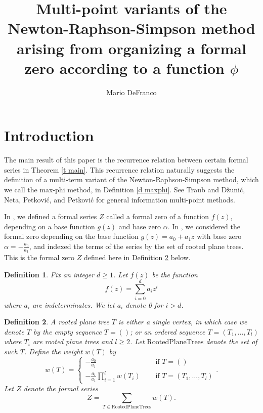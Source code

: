 \documentclass[11pt, oneside]{article}   	%
\newtheorem{definition}{Definition}
\begin{document}
\title{Multi-point variants of the Newton-Raphson-Simpson method arising from organizing a formal zero according to a function $\phi$ }
\author{Mario DeFranco}
\maketitle



\section{Introduction}

The main result of this paper is the recurrence relation between certain formal series in Theorem \ref{t main}. This recurrence relation naturally suggests the definition of a multi-term variant of the Newton-Raphson-Simpson method,  which we call the max-phi method, in Definition \ref{d maxphi}. See Traub \cite{Traub} and D\u{z}uni\'{c}, Neta, Petkovi\'{c}, and Petkovi\'{c} \cite{Dzunic} for general information multi-point methods. 

In \cite{DeFranco gb}, we defined a formal series $Z$ called a formal zero of a function $f(z)$, depending on a base function $g(z)$ and base zero $\alpha$. In \cite{DeFranco ce}, we considered the formal zero depending on the base function $g(z) = a_0 + a_1z$ with base zero $\alpha=-\frac{a_0}{a_1}$, and indexed the terms of the series by the set of rooted plane trees. This is the formal zero $Z$ defined here in Definition \ref{d RPT} below.

\begin{definition} 
Fix an integer $d \geq 1$. Let $f(z)$ be the function 
\[
f(z) = \sum_{i=0}^d a_i z^i
\]
where $a_i$ are indeterminates. We let $a_i$ denote 0 for $i >d$.
\end{definition}

\begin{definition} \label{d RPT}
A rooted plane tree $T$ is either a single vertex, in which case we denote $T$ by the empty sequence $T=()$; or an ordered sequence $T=(T_1, \ldots, T_l)$ where $T_i$ are rooted plane trees and $l \geq 2$. Let $\mathrm{RootedPlaneTrees}$ denote the set of such $T$. 
Define the weight $w(T)$ by 
\[
w(T) =
 \begin{cases} 
-\frac{a_0}{a_1} &\quad \text{ if } T = () \\ 
-\frac{a_l}{a_1} \prod_{i=1}^l w(T_i) &\quad \text{ if } T = (T_1, \ldots, T_l)
\end{cases}.
\]
Let $Z$ denote the formal series 
\[
Z = \sum_{T \in \mathrm{RootedPlaneTrees}} w(T).
\]
\end{definition}
\end{document}
